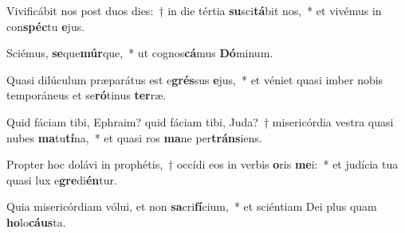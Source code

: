 \item Vivificábit nos post duos dies:~† in die tértia \textbf{su}sci\textbf{tá}bit nos,~* et vivémus in con\textbf{spéc}tu \textbf{e}jus.
\item Sciémus, \textbf{se}que\textbf{múr}que,~* ut cognos\textbf{cá}mus \textbf{Dó}minum.
\item Quasi dilúculum præparátus est e\textbf{grés}sus \textbf{e}jus,~* et véniet quasi imber nobis temporáneus et se\textbf{ró}tinus \textbf{ter}ræ.
\item Quid fáciam tibi, Ephraim? quid fáciam tibi, Juda?~† misericórdia vestra quasi nubes \textbf{ma}tu\textbf{tí}na,~* et quasi ros \textbf{ma}ne per\textbf{tráns}iens.
\item Propter hoc dolávi in prophétis,~† occídi eos in verbis \textbf{o}ris \textbf{me}i:~* et judícia tua quasi lux e\textbf{gre}di\textbf{én}tur.
\item Quia misericórdiam vólui, et non \textbf{sa}cri\textbf{fí}cium,~* et sciéntiam Dei plus quam \textbf{ho}lo\textbf{cáus}ta.
